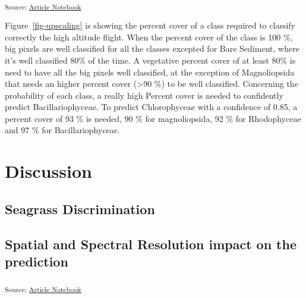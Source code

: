 \documentclass[
  number]{elsarticle}
\begin{document}
\textsubscript{Source:
\href{https://SigOiry.github.io/Drone_Paper_2023/index.qmd.html}{Article
Notebook}}

Figure~\ref{fig-upscaling} is showing the percent cover of a class
required to classify correctly the high altitude flight. When the
percent cover of the class is 100 \%, big pixels are well classified for
all the classes excepted for Bare Sediment, where it's well classified
80\% of the time. A vegetative percent cover of at least 80\% is need to
have all the big pixels well classified, at the exception of
Magnoliopsida that needs an higher percent cover (\textgreater90 \%) to
be well classified. Concerning the probability of each class, a really
high Percent cover is needed to confidently predict Bacillariophyceae.
To predict Chlorophyceae with a confidence of 0.85, a percent cover of
93 \% is needed, 90 \% for magnoliopsida, 92 \% for Rhodophyceae and 97
\% for Bacillariophyceae.

\section{Discussion}\label{discussion}

\subsection{Seagrass Discrimination}\label{seagrass-discrimination}

\subsection{Spatial and Spectral Resolution impact on the
prediction}\label{spatial-and-spectral-resolution-impact-on-the-prediction}

\textsubscript{Source:
\href{https://SigOiry.github.io/Drone_Paper_2023/index.qmd.html}{Article
Notebook}}
\end{document}
